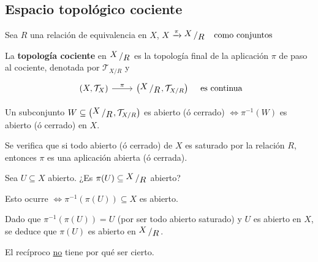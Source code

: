 \subsection{Espacio topológico cociente}

Sea $R$ una relación de equivalencia en $X$, $X \xrightarrow{\pi} \modulo{X}{R} \quad \text{como conjuntos}$
\begin{defi}
La \textbf{topología cociente} en $\modulo{X}{R}$ es la topología final de la aplicación $\pi$ de paso al cociente, denotada por $\mathcal{T}_{{X}/{R}}$ y
\[
   \bt (X, \mathcal{T}_X) \rar{\pi} & \left(\modulo{X}{R}, \mathcal{T}_{X/R}\right) \et \quad \text{es continua}
\]

Un subconjunto $W \subseteq \left(\modulo{X}{R}, \mathcal{T}_{X/R}\right)$ es abierto (ó cerrado) $\iff \pi^{-1}(W)$ es abierto (ó cerrado) en $X$.

\end{defi}
\begin{prop}
    Se verifica que si todo abierto (ó cerrado) de $X$ es saturado por la relación $R$, entonces $\pi$ es una aplicación abierta (ó cerrada).
\end{prop}\begin{dem}
    
Sea $U \subseteq X$ abierto. ¿Es $\pi(U) \subseteq \modulo{X}{R}$ abierto?

Esto ocurre $\iff \pi^{-1}(\pi(U)) \subseteq X$ es abierto.

Dado que $\pi^{-1}(\pi(U)) = U$ (por ser todo abierto saturado) y $U$ es abierto en $X$, se deduce que $\pi(U)$ es abierto en $\modulo{X}{R}$.
\end{dem}
\begin{obs}
    El recíproco \underline{no} tiene por qué ser cierto.
\end{obs}


